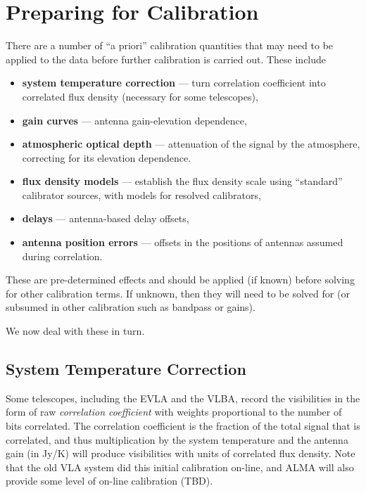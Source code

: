 \section{Preparing for Calibration}
\label{section:cal.prior}

There are a number of ``a priori'' calibration quantities that
may need to be applied to the data before further calibration
is carried out.  These include
\begin{itemize}
   \item {\bf system temperature correction} --- turn correlation
      coefficient into correlated flux density (necessary for some
      telescopes),
   \item {\bf gain curves} --- antenna gain-elevation dependence,
   \item {\bf atmospheric optical depth} --- attenuation of the signal
      by the atmosphere, correcting for its elevation dependence.
   \item {\bf flux density models} --- establish the flux density
      scale using ``standard'' calibrator sources, with models for
      resolved calibrators,
   \item {\bf delays} --- antenna-based delay offsets,
   \item {\bf antenna position errors} --- offsets in the positions of
      antennas assumed during correlation.
\end{itemize}
These are pre-determined effects and should be applied (if known) before
solving for other calibration terms.  If unknown, then they will
need to be solved for (or subsumed in other calibration such as 
bandpass or gains).

We now deal with these in turn.

\subsection{System Temperature Correction}
\label{section:cal.prior.tsys}

Some telescopes, including the EVLA and the VLBA, record the
visibilities in the form of raw {\it correlation coefficient} 
with weights proportional to the number of bits correlated.
The correlation coefficient is the fraction of the total signal
that is correlated, and thus multiplication by the system temperature
and the antenna gain (in Jy/K) will produce visibilities with
units of correlated flux density.  Note that the old VLA system did
this initial calibration on-line, and ALMA will also provide some
level of on-line calibration (TBD).

